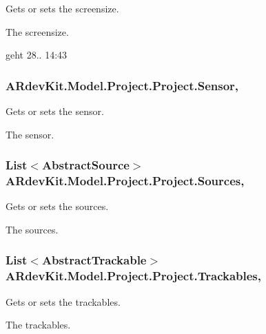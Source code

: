 Gets or sets the screensize. 

The screensize. 

geht 28.. 14\-:43\hypertarget{class_a_rdev_kit_1_1_model_1_1_project_1_1_project_ac22f350013113d1e85605346d824cbc1}{
\subsubsection[{Sensor}]{ A\-Rdev\-Kit.\-Model.\-Project.\-Project.\-Sensor\hspace{0.3cm}{\ttfamily [get]}, {\ttfamily [set]}}}\label{class_a_rdev_kit_1_1_model_1_1_project_1_1_project_ac22f350013113d1e85605346d824cbc1}


Gets or sets the sensor. 

The sensor. \hypertarget{class_a_rdev_kit_1_1_model_1_1_project_1_1_project_ade6d1eebeab2acee826e2ddf22724fb5}{
\subsubsection[{Sources}]{\setlength{\rightskip}{0pt plus 5cm}List$<${\bf Abstract\-Source}$>$ A\-Rdev\-Kit.\-Model.\-Project.\-Project.\-Sources\hspace{0.3cm}{\ttfamily [get]}, {\ttfamily [set]}}}\label{class_a_rdev_kit_1_1_model_1_1_project_1_1_project_ade6d1eebeab2acee826e2ddf22724fb5}


Gets or sets the sources. 

The sources. \hypertarget{class_a_rdev_kit_1_1_model_1_1_project_1_1_project_af3d7540cfeabb22ce7290378d7039a76}{
\subsubsection[{Trackables}]{\setlength{\rightskip}{0pt plus 5cm}List$<${\bf Abstract\-Trackable}$>$ A\-Rdev\-Kit.\-Model.\-Project.\-Project.\-Trackables\hspace{0.3cm}{\ttfamily [get]}, {\ttfamily [set]}}}\label{class_a_rdev_kit_1_1_model_1_1_project_1_1_project_af3d7540cfeabb22ce7290378d7039a76}


Gets or sets the trackables. 

The trackables. 